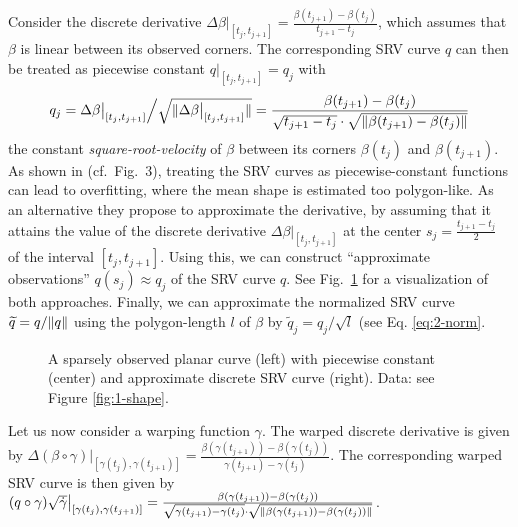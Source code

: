 Consider the discrete derivative $\Delta \beta \big\rvert_{[t_j, t_{j+1}]} = \frac{\beta(t_{j+1}) - \beta(t_{j})}{t_{j+1} - t_j}$, which assumes that $\beta$ is linear between its observed corners. 
The corresponding SRV curve $q$ can then be treated as piecewise constant $q\big\rvert_{[t_{j},t_{j+1}]} = q_j$ with 
\begin{equation}
  q_j = \Delta \beta \big\rvert_{[t_j, t_{j+1}]} \Big/ \sqrt{\lVert\Delta \beta \big\rvert_{[t_j, t_{j+1}]}\rVert} = \frac{\beta(t_{j+1}) - \beta(t_j)}{\sqrt{t_{j+1} - t_j} \cdot \sqrt{\lVert\beta(t_{j+1}) - \beta(t_j)\rVert}}
\end{equation}
the constant \emph{square-root-velocity} of $\beta$ between its corners $\beta(t_j)$ and $\beta(t_{j+1})$.
As shown in \cite{Steyer2021} (cf.\ Fig.\ 3), treating the SRV curves as piecewise-constant functions can lead to overfitting, where the mean shape is estimated too polygon-like.
As an alternative they  propose to approximate the derivative, by assuming that it attains the value of the discrete derivative $\Delta \beta \big\rvert_{[t_j,t_{j+1}]}$ at the center $s_j = \frac{t_{j+1} - t_j}{2}$ of the interval $[t_j, t_{j+1}]$.
Using this, we can construct \enquote{approximate observations} $q(s_j) \approx q_j$ of the SRV curve $q$.
See Fig.\ \ref{fig:3-disc} for a visualization of both approaches.
Finally, we can approximate the normalized SRV curve $\widetilde q = q / \lVert q\rVert$ using the polygon-length $l$ of $\beta$ by $\widetilde q_j = q_j \big/ \sqrt{l}$ (see Eq. \ref{eq:2-norm}.

\begin{figure}
  \centering
  \begin{subfigure}{.32\textwidth}
    \centering
  \end{subfigure}\hfill%
  \begin{subfigure}{.32\textwidth}
    \centering
  \end{subfigure}\hfill%
  \begin{subfigure}{.32\textwidth}
    \centering
  \end{subfigure}
  \caption{A sparsely observed planar curve (left) with piecewise constant (center) and approximate discrete SRV curve (right). Data: see Figure \ref{fig:1-shape}.}
  \label{fig:3-disc}
\end{figure}

Let us now consider a warping function $\gamma$.
The warped discrete derivative is given by $\Delta (\beta \circ \gamma) \big\rvert_{[\gamma(t_j), \gamma(t_{j+1})]} = \frac{\beta(\gamma(t_{j+1})) - \beta(\gamma(t_{j}))}{\gamma(t_{j+1}) - \gamma(t_j)}$.
The corresponding warped SRV curve is then given by  $(q \circ \gamma) \sqrt{\dot\gamma} \big\rvert_{[\gamma(t_j), \gamma(t_{j+1})]} = \frac{\beta(\gamma(t_{j+1})) - \beta(\gamma(t_j))}{\sqrt{\gamma(t_{j+1}) - \gamma(t_j)} \cdot \sqrt{\lVert\beta(\gamma(t_{j+1})) - \beta(\gamma(t_j))\rVert}}$.



